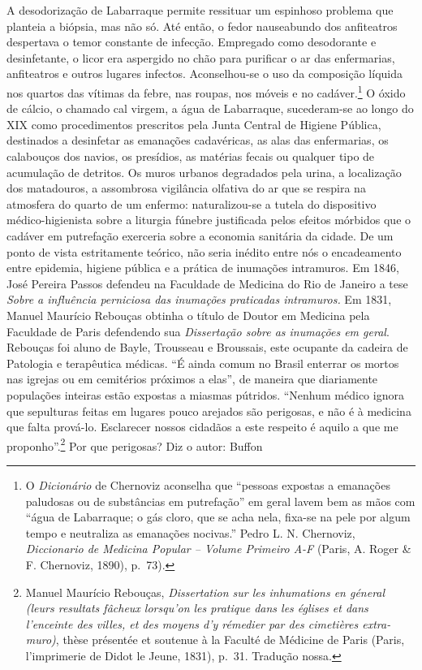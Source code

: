 A desodorização de Labarraque permite ressituar um espinhoso problema
que planteia a biópsia, mas não só. Até então, o fedor nauseabundo dos
anfiteatros despertava o temor constante de infecção. Empregado como
desodorante e desinfetante, o licor era aspergido no chão para purificar
o ar das enfermarias, anfiteatros e outros lugares infectos.
Aconselhou-se o uso da composição líquida nos quartos das vítimas da
febre, nas roupas, nos móveis e no cadáver.\footnote{O \emph{Dicionário}
  de Chernoviz aconselha que ``pessoas expostas a emanações paludosas ou
  de substâncias em putrefação'' em geral lavem bem as mãos com ``água
  de Labarraque; o gás cloro, que se acha nela, fixa-se na pele por
  algum tempo e neutraliza as emanações nocivas.'' Pedro L. N.
  Chernoviz, \emph{Diccionario de Medicina Popular -- Volume Primeiro
  A-F} (Paris, A. Roger \& F. Chernoviz, 1890), p.~73).} O óxido de
cálcio, o chamado cal virgem, a água de Labarraque, sucederam-se ao
longo do XIX como procedimentos prescritos pela Junta Central de Higiene
Pública, destinados a desinfetar as emanações cadavéricas, as alas das
enfermarias, os calabouços dos navios, os presídios, as matérias fecais
ou qualquer tipo de acumulação de detritos. Os muros urbanos degradados
pela urina, a localização dos matadouros, a assombrosa vigilância
olfativa do ar que se respira na atmosfera do quarto de um enfermo:
naturalizou-se a tutela do dispositivo médico-higienista sobre a
liturgia fúnebre justificada pelos efeitos mórbidos que o cadáver em
putrefação exerceria sobre a economia sanitária da cidade. De um ponto
de vista estritamente teórico, não seria inédito entre nós o
encadeamento entre epidemia, higiene pública e a prática de inumações
intramuros. Em 1846, José Pereira Passos defendeu na Faculdade de
Medicina do Rio de Janeiro a tese \emph{Sobre a influência perniciosa
das inumações praticadas intramuros.} Em 1831, Manuel Maurício Rebouças
obtinha o título de Doutor em Medicina pela Faculdade de Paris
defendendo sua \emph{Dissertação sobre as inumações em geral}. Rebouças
foi aluno de Bayle, Trousseau e Broussais, este ocupante da cadeira de
Patologia e terapêutica médicas. ``É ainda comum no Brasil enterrar os
mortos nas igrejas ou em cemitérios próximos a elas'', de maneira que
diariamente populações inteiras estão expostas a miasmas pútridos.
``Nenhum médico ignora que sepulturas feitas em lugares pouco arejados
são perigosas, e não é à medicina que falta prová-lo. Esclarecer nossos
cidadãos a este respeito é aquilo a que me proponho''.\footnote{Manuel
  Maurício Rebouças, \emph{Dissertation sur les inhumations en géneral
  (leurs resultats fâcheux lorsqu'on les pratique dans les églises et
  dans l'enceinte des villes, et des moyens d'y rémedier par des
  cimetières extra-muro)}, thèse présentée et soutenue à la Faculté de
  Médicine de Paris (Paris, l'imprimerie de Didot le Jeune, 1831),
  p.~31. Tradução nossa.} Por que perigosas? Diz o autor: Buffon
